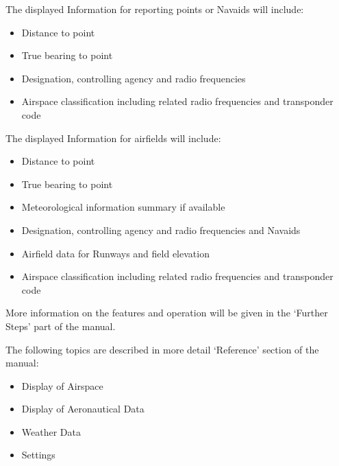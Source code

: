 \documentclass[letterpaper,10pt,english]{sphinxmanual}
\begin{document}
\sphinxAtStartPar
The displayed Information for reporting points or Navaids will include:
\begin{itemize}
\item {} 
\sphinxAtStartPar
Distance to point

\item {} 
\sphinxAtStartPar
True bearing to point

\item {} 
\sphinxAtStartPar
Designation, controlling agency and radio frequencies

\item {} 
\sphinxAtStartPar
Airspace classification including related radio frequencies and transponder
code

\end{itemize}

\sphinxAtStartPar
The displayed Information for airfields will include:
\begin{itemize}
\item {} 
\sphinxAtStartPar
Distance to point

\item {} 
\sphinxAtStartPar
True bearing to point

\item {} 
\sphinxAtStartPar
Meteorological information summary if available

\item {} 
\sphinxAtStartPar
Designation, controlling agency and radio frequencies and Navaids

\item {} 
\sphinxAtStartPar
Airfield data for Runways and field elevation

\item {} 
\sphinxAtStartPar
Airspace classification including related radio frequencies and transponder
code

\end{itemize}

\sphinxAtStartPar
More information on the features and operation will be given in the ‘Further
Steps’ part of the  manual.

\sphinxAtStartPar
The following topics are described in more detail 
‘Reference’ section of the manual:
\begin{itemize}
\item {} 
\sphinxAtStartPar
Display of Airspace

\item {} 
\sphinxAtStartPar
Display of Aeronautical Data

\item {} 
\sphinxAtStartPar
Weather Data

\item {} 
\sphinxAtStartPar
Settings

\end{itemize}
\end{document}

